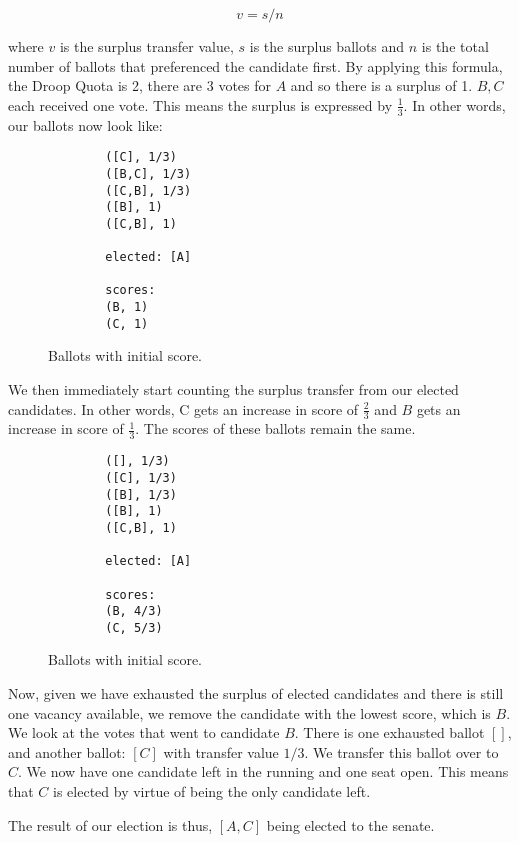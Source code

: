 $$
v = s/n
$$

where $v$ is the surplus transfer value, $s$ is the surplus ballots and $n$ is
the total number of ballots that preferenced the candidate first. By applying
this formula, the Droop Quota is 2, there are 3 votes for $A$ and so there is a
surplus of 1. $B, C$ each received one vote. This means the surplus is expressed
by $\frac{1}{3}$. In other words, our ballots now look like: 

\begin{figure}[ht!!!!!!!!]
    \caption{Ballots with initial score.}
    \label{sample_election2}
    \begin{lstlisting}
        ([C], 1/3)
        ([B,C], 1/3)
        ([C,B], 1/3)
        ([B], 1)
        ([C,B], 1)
        
        elected: [A]
        
        scores: 
        (B, 1)
        (C, 1)
    \end{lstlisting}
\end{figure}

We then immediately start counting the surplus transfer from our elected
candidates. In other words, C gets an increase in score of $\frac{2}{3}$ and $B$
gets an increase in score of $\frac{1}{3}$. The scores of these ballots remain
the same. 

\begin{figure}[ht!!!!!!!!]
    \caption{Ballots with initial score.}
    \label{sample_election3}
    \begin{lstlisting}
        ([], 1/3)
        ([C], 1/3)
        ([B], 1/3)
        ([B], 1)
        ([C,B], 1)
        
        elected: [A]
        
        scores: 
        (B, 4/3)
        (C, 5/3)
    \end{lstlisting}
\end{figure}

Now, given we have exhausted the surplus of elected candidates and there is
still one vacancy available, we remove the candidate with the lowest score,
which is $B$. We look at the votes that went to candidate $B$. There is one
exhausted ballot $[]$, and another ballot: $[C]$ with transfer value $1/3$. We
transfer this ballot over to $C$. We now have one candidate left in the running
and one seat open. This means that $C$ is elected by virtue of being the only
candidate left. 

The result of our election is thus, $[A,C]$ being elected to the senate.  

